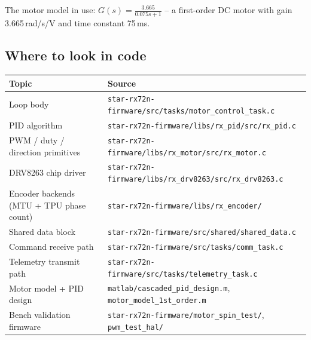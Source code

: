 The motor model in use:
$G(s) = \frac{3.665}{0.075 s + 1}$ -- a first-order DC motor with
gain 3.665\,rad/s/V and time constant 75\,ms.

\subsection{Where to look in code}

\begin{center}
\begin{tabular}{|p{5.5cm}|p{8.5cm}|}
\hline
\textbf{Topic}                              & \textbf{Source}                                                              \\
\hline
Loop body                                    & \texttt{star-rx72n-firmware/src/tasks/motor\_control\_task.c}               \\
PID algorithm                                & \texttt{star-rx72n-firmware/libs/rx\_pid/src/rx\_pid.c}                     \\
PWM / duty / direction primitives            & \texttt{star-rx72n-firmware/libs/rx\_motor/src/rx\_motor.c}                  \\
DRV8263 chip driver                          & \texttt{star-rx72n-firmware/libs/rx\_drv8263/src/rx\_drv8263.c}              \\
Encoder backends (MTU + TPU phase count)     & \texttt{star-rx72n-firmware/libs/rx\_encoder/}                                \\
Shared data block                            & \texttt{star-rx72n-firmware/src/shared/shared\_data.c}                       \\
Command receive path                         & \texttt{star-rx72n-firmware/src/tasks/comm\_task.c}                          \\
Telemetry transmit path                      & \texttt{star-rx72n-firmware/src/tasks/telemetry\_task.c}                     \\
Motor model + PID design                     & \texttt{matlab/cascaded\_pid\_design.m}, \texttt{motor\_model\_1st\_order.m}  \\
Bench validation firmware                    & \texttt{star-rx72n-firmware/motor\_spin\_test/}, \texttt{pwm\_test\_hal/}     \\
\hline
\end{tabular}
\end{center}
